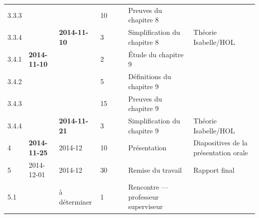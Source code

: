 \documentclass[a4paper, oneside, 12pt, titlepage]{article}
\begin{document}
\begin{landscape}
\begin{table}[!h]
\begin{tabular}{|l||l|l|p{1.6cm}|p{1.6cm}|c||l|l|}
    3.3.3 &                     &                     & 10 &   &            & Preuves du chapitre 8 & \\
    3.3.4 &                     & \textbf{2014-11-10} & 3  &   &            & Simplification du chapitre 8 & Théorie Isabelle/HOL \\
    \hline
    3.4.1 & \textbf{2014-11-10} &                     & 2  & & & Étude du chapitre 9 & \\
    3.4.2 &                     &                     & 5  & & & Définitions du chapitre 9 & \\
    3.4.3 &                     &                     & 15 & & & Preuves du chapitre 9 & \\
    3.4.4 &                     & \textbf{2014-11-21} & 3  & & & Simplification du chapitre 9 & Théorie Isabelle/HOL \\
    \hline
    4 & \textbf{2014-11-25} & 2014-12 & 10 & & & Présentation & Diapositives de la présentation orale \\
    \hline
    5   & 2014-12-01 & 2014-12      & 30 & & & Remise du travail & Rapport final \\
    5.1 &            & à déterminer & 1  & & & Rencontre --- professeur superviseur & \\
    \hline
  \end{tabular}
\end{table}

\end{landscape}
\restoregeometry
\end{document}
